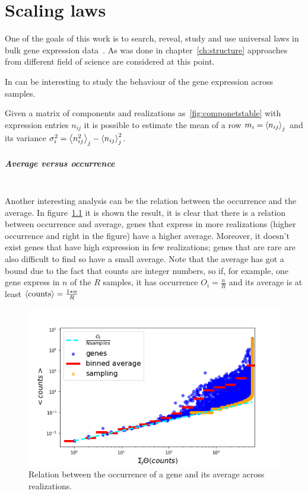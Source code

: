 \chapter{Scaling laws}\label{ch:scalinglaws}
One of the goals of this work is to search, reveal, study and use universal laws in bulk gene expression data~\nocite{altmann2016statistical}. As was done in chapter~\ref{ch:structure} approaches from different field of science are considered at this point.

In can be interesting to study the behaviour of the gene expression across samples.

Given a matrix of components and realizations as~\ref{fig:componetstable} with expression entries $n_{i j}$ it is possible to estimate the mean of a row $m_i=\left\langle n_{i
 j}\right\rangle_j$ and its variance $\sigma^2_{i}=\left\langle n_{i j}^2\right\rangle_j - \left\langle n_{i j}\right\rangle^2_j$.



\paragraph{Average versus occurrence}\mbox{}\\
Another interesting analysis can be the relation between the occurrence and the average. In figure~\ref{fig:scalinglaws/gtex/meanDiff_binned_sampling} it is shown the result, it is clear that there is a relation between occurrence and average, genes that express in more realizations (higher occurrence and right in the figure) have a higher average. Moreover, it doesn't exist genes that have high expression in few realizations; genes that are rare are also difficult to find so have a small average. Note that the average has got a bound due to the fact that counts are integer numbers, so if, for example, one gene express in $n$ of the $R$ samples, it has occurrence $O_i=\frac{n}{R}$ and its average is at least $\left\langle \mathrm{counts}\right\rangle=\frac{1*n}{R}$
\begin{figure}[htb!]
    \centering
    \includegraphics[width=0.9\linewidth]{pictures/scalinglaws/gtex/meanDiff_binned_sampling.png}
    \caption{Relation between the occurrence of a gene and its average across realizations.}
    \label{fig:scalinglaws/gtex/meanDiff_binned_sampling}
\end{figure}
